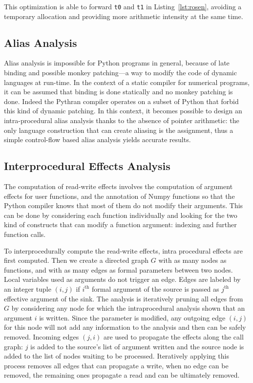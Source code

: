 \documentclass[10pt, preprint]{sigplanconf}
\begin{document}
This optimization is able to forward \texttt{t0} and \texttt{t1} in
Listing~\ref{lst:rosen}, avoiding a temporary allocation and providing more
arithmetic intensity at the same time.


\subsection{Alias Analysis}
\label{sec:alias}

Alias analysis is impossible for Python programs in general, because of late
binding and possible monkey patching---a way to modify the code of dynamic
languages at run-time. In the context of a static compiler for
numerical programs, it can be assumed that binding is done statically and no
monkey patching is done. Indeed the Pythran compiler operates on a subset of
Python that forbid this kind of dynamic patching.
In this context, it becomes possible to design an intra-procedural alias
analysis thanks to the absence of pointer arithmetic:
the only language construction that can create aliasing is the assignment, thus
a simple control-flow based alias analysis yields accurate results.

\subsection{Interprocedural Effects Analysis}
\label{sec:effects}

The computation of read-write effects involves the computation of argument
effects for user functions, and the annotation of Numpy functions
so that the Python compiler knows that most of them do not modify their
arguments. This can be done by considering each function individually and
looking for the two kind of constructs that can modify a function argument:
indexing and further function calls.

To interprocedurally compute the read-write effects, intra procedural effects
are first computed. Then we create a directed graph $G$ with as many nodes as
functions, and with as many edges as formal parameters between two nodes. Local
variables used as arguments do not trigger an edge.
Edges are labeled by an integer tuple $(i, j)$ if $i^\text{th}$ formal
argument of the source is passed as $j^\text{th}$ effective argument of the
sink. The analysis is iteratively pruning all edges from $G$ by considering any
node for which the intraprocedural analysis shown that an argument $i$ is
written. Since the parameter is modified, any outgoing edge $(i, j)$ for this
node will not add any information to the analysis and then can be safely
removed. Incoming edges $(j, i)$ are used to propagate the effects along the
call graph: $j$ is added to the source's list of argument written and the source
node is added to the list of nodes waiting to be processed. Iteratively
applying this process removes all edges that can propagate a write, when no edge
can be removed, the remaining ones propagate a read and can be ultimately
removed.
\end{document}
